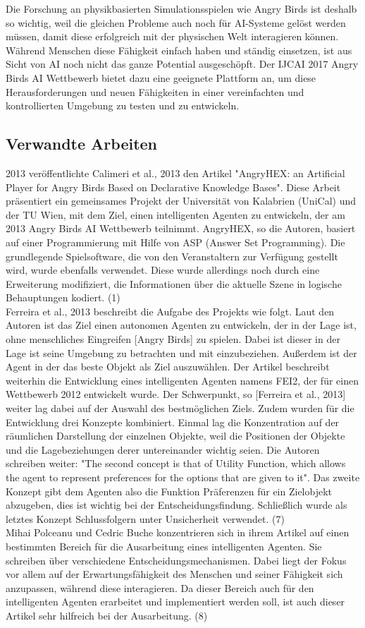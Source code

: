 Die Forschung an physikbasierten Simulationsspielen wie Angry Birds ist deshalb so wichtig, weil die gleichen Probleme auch noch für AI-Systeme gelöst werden müssen, damit diese erfolgreich mit der physischen Welt interagieren können. Während Menschen diese Fähigkeit einfach haben und ständig einsetzen, ist aus Sicht von AI noch nicht das ganze Potential ausgeschöpft. Der IJCAI 2017 Angry Birds AI Wettbewerb bietet dazu eine geeignete Plattform an, um diese Herausforderungen und neuen Fähigkeiten in einer vereinfachten und kontrollierten Umgebung zu testen und zu entwickeln.

\subsection{Verwandte Arbeiten}
2013 veröffentlichte Calimeri et al., 2013 den Artikel "AngryHEX: an Artificial Player for Angry Birds Based on Declarative Knowledge Bases". Diese Arbeit präsentiert ein gemeinsames Projekt der Universität von Kalabrien (UniCal) und der TU Wien, mit dem Ziel, einen intelligenten Agenten zu entwickeln, der am 2013 Angry Birds AI Wettbewerb teilnimmt. AngryHEX, so die Autoren, basiert auf einer Programmierung mit Hilfe von ASP (Answer Set Programming). Die grundlegende Spielsoftware, die von den Veranstaltern zur Verfügung gestellt wird, wurde ebenfalls verwendet. Diese wurde allerdings noch durch eine Erweiterung modifiziert, die Informationen über die aktuelle Szene in logische Behauptungen kodiert. (1)\\
Ferreira et al., 2013 beschreibt die Aufgabe des Projekts wie folgt. Laut den Autoren ist das Ziel einen autonomen Agenten zu entwickeln, der in der Lage ist, ohne menschliches Eingreifen [Angry Birds] zu spielen. Dabei ist dieser in der Lage ist seine Umgebung zu betrachten und mit einzubeziehen. Außerdem ist der Agent in der das beste Objekt als Ziel auszuwählen. Der Artikel beschreibt weiterhin die Entwicklung eines intelligenten Agenten namens FEI2, der für einen Wettbewerb 2012 entwickelt wurde. Der Schwerpunkt, so [Ferreira et al., 2013] weiter lag dabei auf der Auswahl des bestmöglichen Ziels. Zudem wurden für die Entwicklung drei Konzepte kombiniert. Einmal lag die Konzentration auf der räumlichen Darstellung der einzelnen Objekte, weil die Positionen der Objekte und die Lagebeziehungen derer untereinander wichtig seien. Die Autoren schreiben weiter: "The second concept is that of Utility Function, which allows the agent to represent preferences for the options that are given to it". Das zweite Konzept gibt dem Agenten also die Funktion Präferenzen für ein Zielobjekt abzugeben, dies ist wichtig bei der Entscheidungsfindung. Schließlich wurde als letztes Konzept Schlussfolgern unter Unsicherheit verwendet. (7)\\
Mihai Polceanu und Cedric Buche konzentrieren sich in ihrem Artikel auf einen bestimmten Bereich für die Ausarbeitung eines intelligenten Agenten. Sie schreiben über verschiedene Entscheidungsmechanismen. Dabei liegt der Fokus vor allem auf der Erwartungsfähigkeit des Menschen und seiner Fähigkeit sich anzupassen, während diese interagieren. Da dieser Bereich auch für den intelligenten Agenten erarbeitet und implementiert werden soll, ist auch dieser Artikel sehr hilfreich bei der Ausarbeitung. (8)

